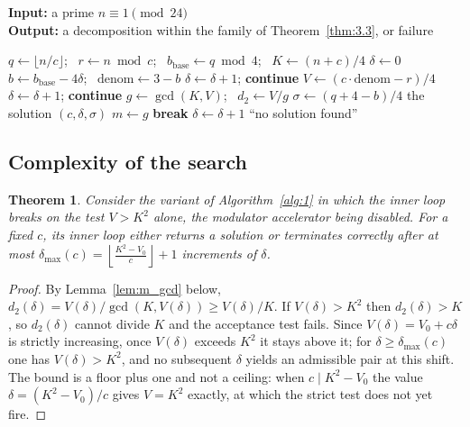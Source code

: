 \documentclass[11pt, a4paper]{article}
\theoremstyle{plain}
\newtheorem{theorem}{Theorem}[section]
\theoremstyle{definition}
\begin{document}
\begin{algorithm}[H]
\caption{Divisor-based search for $n \equiv 1 \pmod{24}$} \label{alg:1}
\textbf{Input:} a prime $n \equiv 1 \pmod{24}$ \\
\textbf{Output:} a decomposition within the family of Theorem~\ref{thm:3.3}, or failure
\begin{algorithmic}[1]
        \State $q \gets \lfloor n/c \rfloor$; \ $r \gets n \bmod c$; \ $b_{\text{base}} \gets q \bmod 4$; \ $K \gets (n+c)/4$
        \State $\delta \gets 0$
            \State $b \gets b_{\text{base}} - 4\delta$; \ $\text{denom} \gets 3 - b$
             \State $\delta \gets \delta+1$; \textbf{continue} \EndIf
            \State $V \gets (c \cdot \text{denom} - r)/4$
             \State $\delta \gets \delta+1$; \textbf{continue} \EndIf
            \State $g \gets \gcd(K, V)$; \ $d_2 \gets V/g$
                \State $\sigma \gets (q+4-b)/4$
                \State \Return the solution $(c, \delta, \sigma)$
            \EndIf
            \State $m \gets g$ 
                \State \textbf{break} 
            \EndIf
            \State $\delta \gets \delta+1$
        \EndWhile
    \EndFor
    \State \Return ``no solution found''
\end{algorithmic}
\end{algorithm}

\subsection{Complexity of the search} \label{sec:3.9}

\begin{theorem} \label{thm:3.18}
Consider the variant of Algorithm~\ref{alg:1} in which the inner loop breaks on the test $V>K^{2}$ alone, the modulator accelerator being disabled. For a fixed $c$, its inner loop either returns a solution or terminates correctly after at most $\delta_{\max}(c) = \left\lfloor \frac{K^2-V_0}{c} \right\rfloor+1$ increments of $\delta$.
\end{theorem}
\begin{proof}
By Lemma~\ref{lem:m_gcd} below, $d_2(\delta) = V(\delta)/\gcd(K, V(\delta)) \ge V(\delta)/K$. If $V(\delta) > K^2$ then $d_2(\delta) > K$, so $d_2(\delta)$ cannot divide $K$ and the acceptance test fails. Since $V(\delta) = V_0 + c\delta$ is strictly increasing, once $V(\delta)$ exceeds $K^{2}$ it stays above it; for $\delta \ge \delta_{\max}(c)$ one has $V(\delta)>K^{2}$, and no subsequent $\delta$ yields an admissible pair at this shift. The bound is a floor plus one and not a ceiling: when $c\mid K^{2}-V_0$ the value $\delta=(K^{2}-V_0)/c$ gives $V=K^{2}$ exactly, at which the strict test does not yet fire.
\end{proof}
\end{document}

